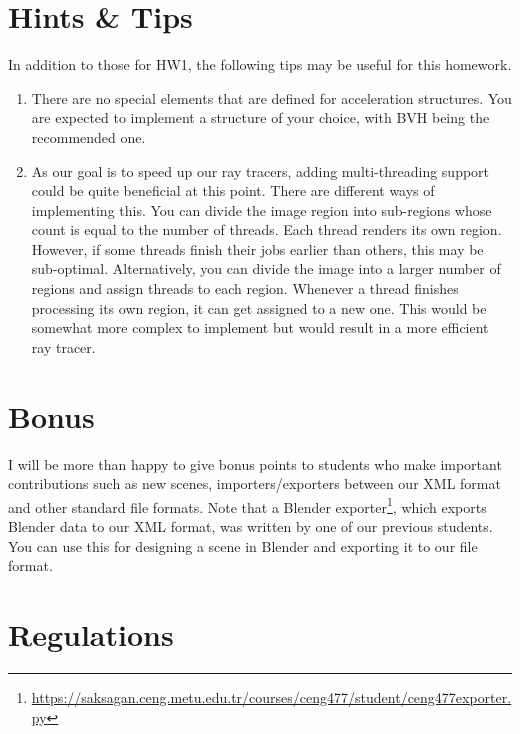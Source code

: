 \documentclass[12pt]{article}
\begin{document}
\section{Hints \& Tips}
In addition to those for HW1, the following tips may be useful for this
homework.

\begin{enumerate}
\item \textbf{} There are no special elements that are defined
for acceleration structures. You are expected to implement a structure
of your choice, with BVH being the recommended one.

\item \textbf{} As our goal is to speed up our ray tracers, adding
multi-threading support could be quite beneficial at this point. There
are different ways of implementing this. You can divide the
image region into sub-regions whose count is equal to the number of
threads. Each thread renders its own region. However, if some threads
finish their jobs earlier than others, this may be sub-optimal.
Alternatively, you can divide the image into a larger number of regions
and assign threads to each region. Whenever a thread finishes processing
its own region, it can get assigned to a new one. This would be
somewhat more complex to implement but would result in a more efficient
ray tracer.

\end{enumerate}

\section{Bonus}

I will be more than happy to give bonus points to students who
make important contributions such as new scenes, importers/exporters
between our XML format and other standard file formats. Note that a
Blender
exporter\footnote{\url{https://saksagan.ceng.metu.edu.tr/courses/ceng477/student/ceng477exporter.py}},
which exports Blender data to our XML format, was written by one of our
previous students. You can use this for designing a scene in Blender and
exporting it to our file format.

\section{Regulations}
\end{document}

